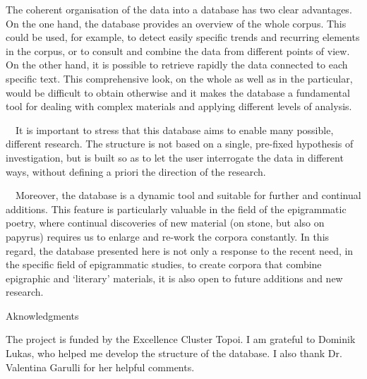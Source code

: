 \documentclass[amsthm,ebook]{saparticle}
\begin{document}
The coherent organisation of the data into a database has two clear advantages. On the one hand, the database provides
an overview of the whole corpus. This could be used, for example, to detect easily specific trends and recurring
elements in the corpus, or to consult and combine the data from different points of view. On the other hand, it is
possible to retrieve rapidly the data connected to each specific text. This comprehensive look, on the whole as well as
in the particular, would be difficult to obtain otherwise and it makes the database a fundamental tool for dealing with
complex materials and applying different levels of analysis.

\ \ It is important to stress that this database aims to enable many possible, different research. The structure is not
based on a single, pre-fixed hypothesis of investigation, but is built so as to let the user interrogate the data in
different ways, without defining a priori the direction of the research. 

\ \ Moreover, the database is a dynamic tool and suitable for further and continual additions. This feature is
particularly valuable in the field of the epigrammatic poetry, where continual discoveries of new material (on stone,
but also on papyrus) requires us to enlarge and re-work the corpora constantly. In this regard, the database presented
here is not only a response to the recent need, in the specific field of epigrammatic studies, to create corpora that
combine epigraphic and ‘literary’ materials, it is also open to future additions and new research.




Aknowledgments


\bigskip

The project is funded by the Excellence Cluster Topoi. I am grateful to Dominik Lukas, who helped me develop the
structure of the database. I also thank Dr. Valentina Garulli for her helpful comments.



\end{document}
